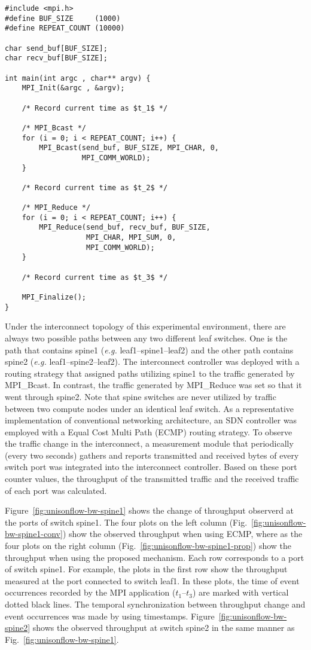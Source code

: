 \begin{lstlisting}[caption={Source code of MPI application}, label=lst:sync-mpi-app, float=htbp]
#include <mpi.h>
#define BUF_SIZE     (1000)
#define REPEAT_COUNT (10000)

char send_buf[BUF_SIZE];
char recv_buf[BUF_SIZE];

int main(int argc , char** argv) {
    MPI_Init(&argc , &argv);

    /* Record current time as $t_1$ */

    /* MPI_Bcast */
    for (i = 0; i < REPEAT_COUNT; i++) {
        MPI_Bcast(send_buf, BUF_SIZE, MPI_CHAR, 0,
                  MPI_COMM_WORLD);
    }

    /* Record current time as $t_2$ */

    /* MPI_Reduce */
    for (i = 0; i < REPEAT_COUNT; i++) {
        MPI_Reduce(send_buf, recv_buf, BUF_SIZE,
                   MPI_CHAR, MPI_SUM, 0,
                   MPI_COMM_WORLD);
    }

    /* Record current time as $t_3$ */

    MPI_Finalize();
}
\end{lstlisting}

Under the interconnect topology of this experimental environment, there
are always two possible paths between any two different leaf switches.
One is the path that contains spine1 (\emph{e.g.} leaf1--spine1--leaf2) and
the other path contains spine2 (\emph{e.g.} leaf1--spine2--leaf2). The
interconnect controller was deployed with a routing strategy that assigned
paths utilizing spine1 to the traffic generated by MPI\_Bcast. In contrast,
the traffic generated by MPI\_Reduce was set so that it went through spine2.
Note that spine switches are never utilized by traffic between two compute
nodes under an identical leaf switch. As a representative implementation of
conventional networking architecture, an SDN controller was employed with a
Equal Cost Multi Path (ECMP) routing strategy. To observe the traffic change
in the interconnect, a measurement module that periodically (every two
seconds) gathers and reports transmitted and received bytes of every switch
port was integrated into the interconnect controller. Based on these port
counter values, the throughput of the transmitted traffic and the received
traffic of each port was calculated.

Figure~\ref{fig:unisonflow-bw-spine1} shows the change of throughput observerd
at the ports of switch spine1. The four plots on the left column
(Fig.~\ref{fig:unisonflow-bw-spine1-conv}) show the observed throughput when
using ECMP, where as the four plots on the right column
(Fig.~\ref{fig:unisonflow-bw-spine1-prop}) show the throughput when using the
proposed mechanism. Each row corresponds to a port of switch spine1. For
example, the plots in the first row show the throughput measured at the port
connected to switch leaf1. In these plots, the time of event occurrences
recorded by the MPI application ($t_1$--$t_3$) are marked with vertical dotted
black lines. The temporal synchronization between throughput change and event
occurrences was made by using timestamps.
Figure~\ref{fig:unisonflow-bw-spine2} shows the observed throughput at switch
spine2 in the same manner as Fig.~\ref{fig:unisonflow-bw-spine1}.

